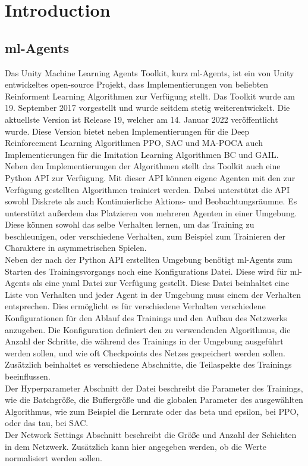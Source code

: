 \section{Introduction}
\subsection{ml-Agents}
Das Unity Machine Learning Agents Toolkit, kurz ml-Agents, ist ein von Unity entwickeltes open-source Projekt, dass Implementierungen von beliebten Reinforment Learning Algorithmen zur Verfügung stellt.
Das Toolkit wurde am 19. September 2017 vorgestellt und wurde seitdem stetig weiterentwickelt. Die aktuellste Version ist Release 19, welcher am 14. Januar 2022 veröffentlicht wurde. Diese Version bietet neben Implementierungen für die Deep Reinforcement Learning Algorithmen PPO, SAC und MA-POCA auch Implementierungen für die Imitation Learning Algorithmen BC und GAIL.\\

\noindent Neben den Implementierungen der Algorithmen stellt das Toolkit auch eine Python API zur Verfügung. Mit dieser API können eigene Agenten mit den zur Verfügung gestellten Algorithmen trainiert werden. Dabei unterstützt die API sowohl Diskrete als auch Kontinuierliche Aktions- und Beobachtungsräumne. Es unterstützt außerdem das Platzieren von mehreren Agenten in einer Umgebung. Diese können sowohl das selbe Verhalten lernen, um das Training zu beschleunigen, oder verschiedene Verhalten, zum Beispiel zum Trainieren der Charaktere in asymmetrischen Spielen. \\

\noindent Neben der nach der Python API erstellten Umgebung benötigt ml-Agents zum Starten des Trainingsvorgangs noch eine Konfigurations Datei. Diese wird für ml-Agents als eine yaml Datei zur Verfügung gestellt. Diese Datei beinhaltet eine Liste von Verhalten und jeder Agent in der Umgebung muss einem der Verhalten entsprechen. Dies ermöglicht es für verschiedene Verhalten verschiedene Konfigurationen für den Ablauf des Trainings und den Aufbau des Netzwerks anzugeben. 
Die Konfiguration definiert den zu verwendenden Algorithmus, die Anzahl der Schritte, die während des Trainings in der Umgebung ausgeführt werden sollen, und wie oft Checkpoints des Netzes gespeichert werden sollen. Zusätzlich beinhaltet es verschiedene Abschnitte, die Teilaspekte des Trainings beeinflussen. \\
Der Hyperparameter Abschnitt der Datei beschreibt die Parameter des Trainings, wie die Batchgröße, die Buffergröße und die globalen Parameter des ausgewählten Algorithmus, wie zum Beispiel die Lernrate oder das beta und epsilon, bei PPO, oder das tau, bei SAC. \\
Der Network Settings Abschnitt beschreibt die Größe und Anzahl der Schichten in dem Netzwerk. Zusätzlich kann hier angegeben werden, ob die Werte normalisiert werden sollen.\\

